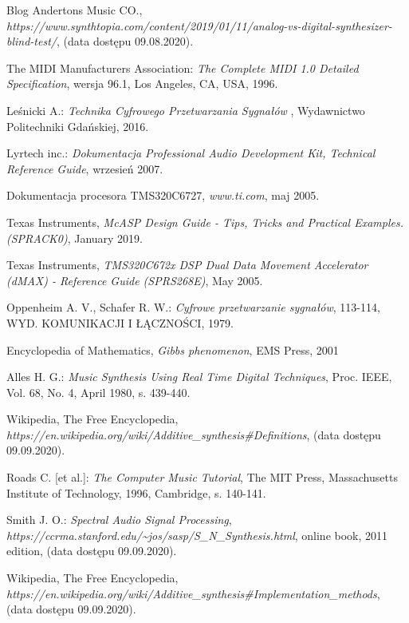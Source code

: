 \documentclass[nostrict]{szablonPG}
\begin{document}
\begin{thebibliography}{20}
		Blog Andertons Music CO., \emph{https://www.synthtopia.com/content/2019/01/11/analog-vs-digital-synthesizer-blind-test/}, (data dostępu 09.08.2020).
	
		The MIDI Manufacturers Association: \emph{The Complete MIDI 1.0 Detailed Specification}, wersja 96.1, Los Angeles, CA, USA, 1996.
		
		Le\'snicki A.: \emph{Technika Cyfrowego Przetwarzania Sygna\l{}\'ow }, Wydawnictwo Politechniki Gda\'nskiej, 2016.
		
		Lyrtech inc.: \emph{Dokumentacja Professional Audio Development Kit, Technical Reference Guide}, wrzesień 2007.
		
		Dokumentacja procesora TMS320C6727, \emph{www.ti.com}, maj 2005.
		
	    Texas Instruments, \emph{McASP Design Guide - Tips, Tricks and Practical Examples. (SPRACK0)}, January 2019.
		
		Texas Instruments, \emph{TMS320C672x DSP Dual Data Movement Accelerator (dMAX) - Reference Guide (SPRS268E)}, May 2005.
		
		Oppenheim A. V., Schafer R. W.: \emph{Cyfrowe przetwarzanie sygnałów}, 113-114, WYD. KOMUNIKACJI I ŁĄCZNOŚCI, 1979.
				
		Encyclopedia of Mathematics, \emph{Gibbs phenomenon}, EMS Press, 2001
		
		Alles H. G.: \emph{Music Synthesis Using Real Time Digital Techniques}, Proc. IEEE, Vol. 68, No. 4, April 1980, s. 439-440.

		Wikipedia, The Free Encyclopedia, \emph{https://en.wikipedia.org/wiki/Additive\_synthesis\#Definitions}, (data dostępu 09.09.2020).
		
		Roads C. [et al.]: \emph{The Computer Music Tutorial}, The MIT Press, Massachusetts Institute of Technology, 1996, Cambridge, s. 140-141.
		
		Smith J. O.: \emph{Spectral Audio Signal Processing}, \emph{https://ccrma.stanford.edu/\textasciitilde jos/sasp/S\_N\_Synthesis.html}, online book, 2011 edition, (data dostępu 09.09.2020).
		
		Wikipedia, The Free Encyclopedia,
		\emph{https://en.wikipedia.org/wiki/Additive\_synthesis\#Implementation\_methods}, (data dostępu 09.09.2020).
		

\end{thebibliography}
\end{document}
